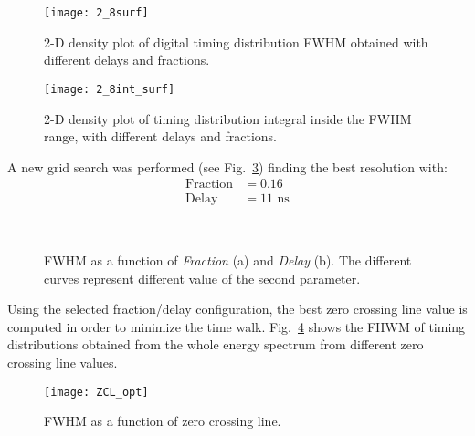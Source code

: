 \begin{figure}[H]
	\centering
	\texttt{[image: 2\_8surf]}
	\caption{2-D density plot of digital timing distribution FWHM obtained with different delays and fractions.}
	\label{Fig:Surf28}
\end{figure}

\begin{figure}[H]
	\centering
	\texttt{[image: 2\_8int\_surf]}
	\caption{2-D density plot of timing distribution integral inside the FWHM range, with different delays and fractions.}
	\label{Fig:Surf_int28}
\end{figure}
 
 A new grid search was performed (see Fig.~\ref{Fig:fd_opt}) finding the best resolution with:
 \[
 \begin{aligned}
\text{Fraction} &=0.16\\
\text{Delay}  &= 11 \text{~ns}
 \end{aligned}
 \]
 
 \begin{figure}[H]
 	\centering
 	 \quad
 	 \\
 	\caption{FWHM as a function of \emph{Fraction} (a) and \emph{Delay} (b). The different curves represent different value of the second parameter.}
 	\label{Fig:fd_opt}
 \end{figure}
 
 Using the selected fraction/delay configuration, the best zero crossing line value is computed in order to minimize the time walk. Fig.~\ref{Fig:Zcl} shows the FHWM of timing distributions obtained from the whole energy spectrum from different zero crossing line values.  
 
\begin{figure}[H]
	\centering
 	\texttt{[image: ZCL\_opt]}
 	\caption{FWHM as a function of zero crossing line.}
 	\label{Fig:Zcl}
 \end{figure}
 
 